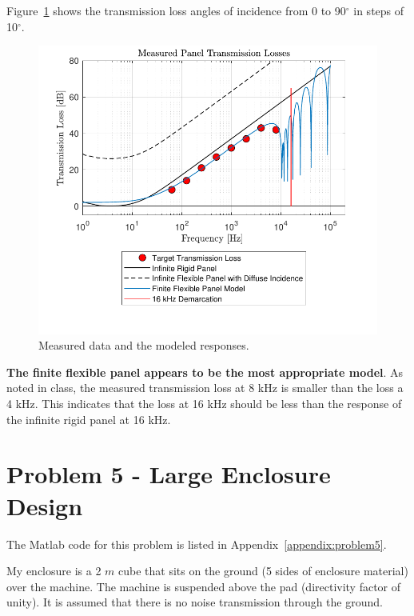 {Figure~\ref{figure:q4dtransmissionLoss} shows the transmission loss angles of incidence from 0 to 90$^\circ$ in steps of 10$^\circ$.

\begin{figure}[htbp]
    \center
    \includegraphics[scale=0.9]{Q4d TL for 75 AOI.pdf}
    \vspace{-0.5cm}
    \caption{Measured data and the modeled responses.}
    \label{figure:q4dtransmissionLoss}
\end{figure}

\textbf{The finite flexible panel appears to be the most appropriate model}.  As noted in class, the measured transmission loss at 8 kHz is smaller than the loss a 4 kHz.  This indicates that the loss at 16 kHz should be less than the response of the infinite rigid panel at 16 kHz.







\newpage
\section*{Problem 5 - Large Enclosure Design}

The Matlab code for this problem is listed in Appendix~\ref{appendix:problem5}.

\vspace{0.25cm}
My enclosure is a 2 $m$ cube that sits on the ground (5 sides of enclosure material) over the machine.  The machine is suspended above the pad (directivity factor of unity).  It is assumed that there is no noise transmission through the ground.

}
